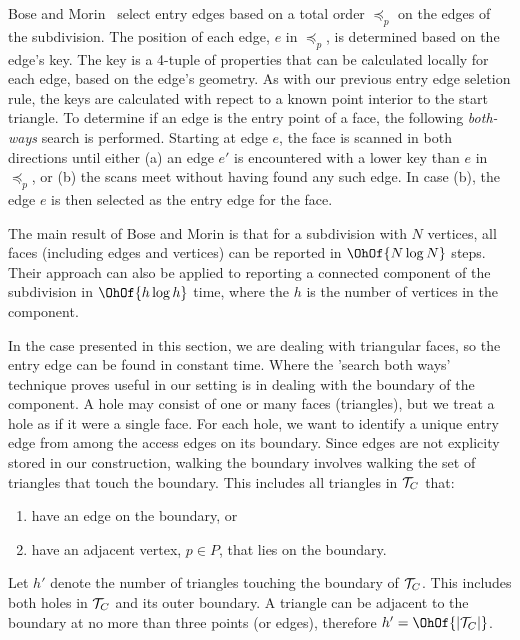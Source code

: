   Bose and Morin~\cite{DBLP:conf/isaac/BoseM00} select entry edges based 
  on a total order $\preceq_p$ on the edges of the subdivision. 
  The position of each edge, $e$ in $\preceq_p$, is determined based on 
  the edge's key. 
  The key is a 4-tuple of properties that can be calculated locally for 
  each edge, based on the edge's geometry. 
  As with our previous entry edge seletion rule, the keys are calculated 
  with repect to a known point interior to the start triangle.
  To determine if an edge is the entry point of a face, the following 
  \emph{both-ways} search is performed.
  Starting at edge $e$, the face is scanned in both directions 
  until either (a) an edge $e'$ is encountered with 
  a lower key than $e$ in $\preceq_p$, or (b) the scans meet without 
  having found any such edge.  
  In case (b), the edge $e$ is then selected as the entry edge for 
  the face.

  The main result of Bose and Morin is that for a subdivision 
  with $N$ vertices, all faces (including edges and vertices) can be 
  reported in $\OhOf{N \log{N}}$ steps. 
  Their approach can also be applied to reporting a connected 
  component of the subdivision in $\OhOf{h \log{h}}$ time, where the 
  $h$ is the number of vertices in the component.  

  In the case presented in this section, we are dealing with 
  triangular faces, so the entry edge can be found in constant time.
  Where the 'search both ways' technique proves useful in our setting 
  is in dealing with the boundary of the component. 
  A hole may consist of 
  one or many faces (triangles), but we treat a hole as if it were a 
  single face.
  For each hole, we want to identify a unique entry edge from among
  the access edges on its boundary.
  Since edges are not explicity stored in our construction, walking
  the boundary involves walking the set of triangles that touch the boundary. 
  This includes all triangles in ${\mathcal{T}}_C$ that:
  
  \begin{enumerate}
  \item have an edge on the boundary, or
  \item have an adjacent vertex, $p \in P$, that lies on the boundary.
  \end{enumerate}
  
  Let $h'$ denote the number of triangles touching the boundary of
  ${\mathcal{T}}_C$. 
  This includes both holes in ${\mathcal{T}}_C$ and its outer boundary.
  A triangle can be adjacent to the boundary at no more than three 
  points (or edges), therefore $h' = \OhOf{|\concomp|}$. 
  

